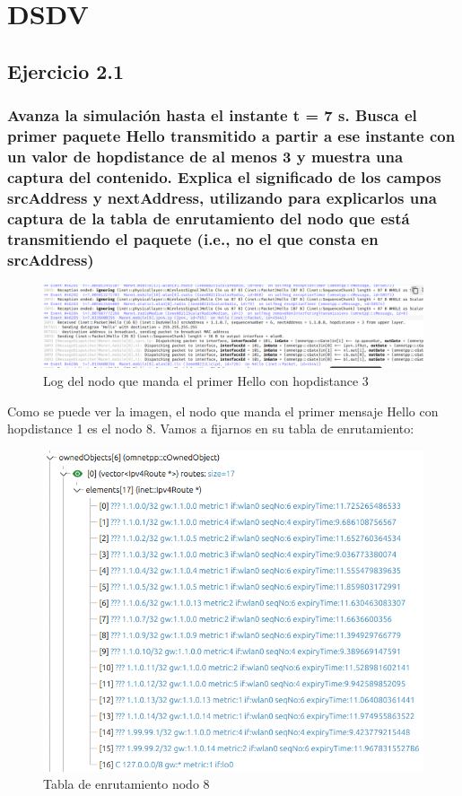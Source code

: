\chapter{DSDV}
\label{chap:dsdv}

\section{Ejercicio 2.1}

\subsection{Avanza la simulación hasta el instante t = 7 s. Busca el primer paquete Hello transmitido a partir a ese
instante con un valor de hopdistance de al menos 3 y muestra una captura del contenido. Explica el significado
de los campos srcAddress y nextAddress, utilizando para explicarlos una captura de la tabla de enrutamiento del
nodo que está transmitiendo el paquete (i.e., no el que consta en srcAddress)}

\begin{figure}[H]
    \centering
    \includegraphics[width=155mm, scale=0.75]{imaxes/dsdv/ejercicio2_1.png}
    \caption{Log del nodo que manda el primer Hello con hopdistance 3}
    \label{fig:ejer2_1}
\end{figure}

Como se puede ver la imagen, el nodo que manda el primer mensaje Hello con hopdistance 1 es el nodo 8. Vamos a fijarnos en su tabla de enrutamiento:

\begin{figure}[H]
    \centering
    \includegraphics[width=115mm, scale=0.75]{imaxes/dsdv/ejercicio2_1_2.png}
    \caption{Tabla de enrutamiento nodo 8}
    \label{fig:ejer2_1}
\end{figure}

